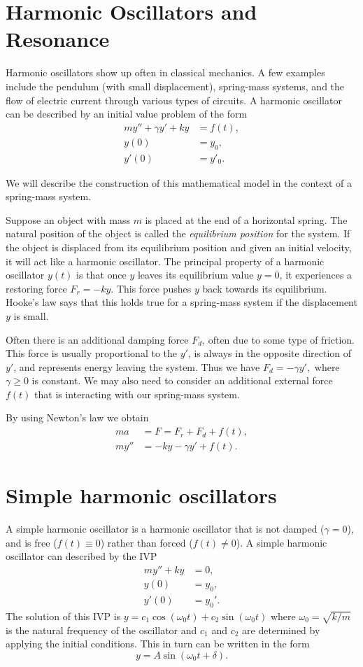\section{Harmonic Oscillators and Resonance} Harmonic oscillators show up often in classical mechanics. 
A few examples include the pendulum (with small 
 displacement), spring-mass systems, and the flow of electric current through various types of circuits. 
A harmonic oscillator can be described by an initial value problem of the form 
\begin{align*}
	my'' + \gamma y' + ky &= f(t) ,\\
	y(0) &= y_0,\\
	y'(0) &= y'_0.
\end{align*}

We will describe the construction of this mathematical model in the context of a spring-mass system.

Suppose an object with mass $m$ is placed at the end of a horizontal spring. 
The natural position of the object is called the \textit{equilibrium position} for the system.
If the object is displaced from its equilibrium position and given an initial velocity,  
it will act like a harmonic oscillator.
The principal property of a harmonic oscillator $y(t)$ is that once $y$ leaves its equilibrium value $y = 0$, it experiences a restoring force $F_r = -ky.$ 
This force pushes $y$ back towards its equilibrium. 
Hooke's law says that this holds true for a 
spring-mass system if the displacement $y$ is small.

Often there is an additional damping force $F_d$, often due to some type of friction. This force is usually proportional to the $y'$, is always in the opposite direction of $y'$, and represents energy leaving the system. 
Thus we have $F_d = -\gamma y', $ where $ \gamma \geq 0$ is constant. 
We may also need to consider an additional external force $f(t)$ that is interacting with our spring-mass system.

By using Newton's law we obtain
\begin{align*}
ma &= F = F_r + F_d + f(t),\\
my'' &= -ky -\gamma y' + f(t).
\end{align*}


\section*{Simple harmonic oscillators}
A simple harmonic oscillator is a harmonic oscillator that is not damped ($\gamma =0$), and is free ($f(t) \equiv 0$) rather than forced ($f(t) \not = 0$). A simple harmonic oscillator can described by the IVP
\begin{align*}
my'' + ky &= 0,\\
y(0) &= y_0,\\
y'(0) &= y_0'.
\end{align*} 
The solution of this IVP is $y = c_1\cos (\omega_0 t) + c_2 \sin (\omega_0 t)$ where $\omega_0 = \sqrt{k/m}$ is the natural frequency of the oscillator and $c_1$ and $c_2$ are determined by applying the initial conditions. This in turn can be written in the form 
\[y = A\sin (\omega_0 t + \delta) .\]


